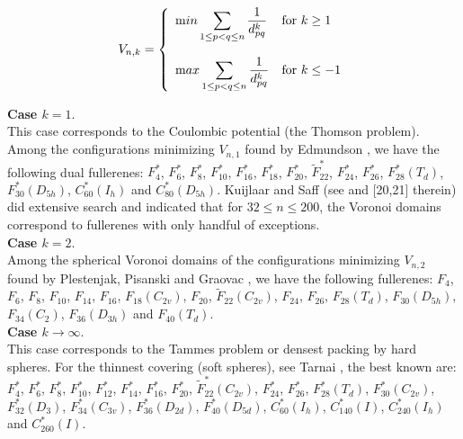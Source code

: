 
\begin{displaymath}
V_{n,k}=\left\{
\begin{array}{ll}
{\displaystyle {\mbox min} \sum_{1\leq p<q\leq n}\frac{1}{d_{pq}^k}} & \mbox{for } k\geq 1\\\\
{\displaystyle {\mbox max} \sum_{1\leq p<q\leq n}\frac{1}{d_{pq}^k}} & \mbox{for } k\leq -1
\end{array}
\right.
\end{displaymath}

\noindent
{\bf Case $k=1$}.\\
This case corresponds to the Coulombic potential (the {\sc Thomson} problem).
Among the configurations minimizing $V_{n,1}$ found by {\sc Edmundson} \cite{e92},
we have the following dual fullerenes:
$F^*_4$, $F^*_6$, $F^*_{8}$, $F^*_{10}$, $F^*_{16}$, $F^*_{18}$, $F^*_{20}$,
$\tilde{F}^*_{22}$, $F^*_{24}$, $F^*_{26}$,
$F^*_{28}(T_d)$, $F^*_{30}(D_{5h})$, $C^*_{60}(I_h)$ and  $C^*_{80}(D_{5h})$.
{\sc Kuijlaar and Saff} (see \cite{ks97} and [20,21] therein) did extensive search and
indicated that for $32\leq n\leq 200$, the Voronoi domains correspond to
fullerenes with only handful of exceptions.\\

\noindent
{\bf Case $k=2$}.\\
Among the spherical Voronoi domains of the configurations minimizing $V_{n,2}$ found by
{\sc Plestenjak, Pisanski and Graovac} \cite{ppg96},
we have the following fullerenes:
$F_4$, $F_6$, $F_{8}$, $F_{10}$, $F_{14}$, $F_{16}$, $F_{18}(C_{2v})$, $F_{20}$, 
$\tilde{F}_{22}(C_{2v})$, $F_{24}$, $F_{26}$,
$F_{28}(T_d)$, $F_{30}(D_{5h})$, $F_{34}(C_2)$, $F_{36}(D_{3h})$ and $F_{40}(T_d)$.\\

\noindent
{\bf Case $k\to \infty$}.\\
This case corresponds to the {\sc Tammes} problem or densest packing by hard spheres.
For the thinnest covering (soft spheres), see {\sc Tarnai} \cite{tarnai2}, the best
known are: 
$F^*_4$, $F^*_6$, $F^*_{8}$, $F^*_{10}$, $F^*_{12}$, $F^*_{14}$, $F^*_{16}$,
$F^*_{20}$, $\tilde{F}^*_{22}(C_{2v})$, $F^*_{24}$, $F^*_{26}$,
$F^*_{28}(T_d)$, $F^*_{30}(C_{2v})$, $F^*_{32}(D_3)$, $F^*_{34}(C_{3v})$, 
$F^*_{36}(D_{2d})$, $F^*_{40}(D_{5d})$, $C^*_{60}(I_h)$, $C^*_{140}(I)$,
$C^*_{240}(I_h)$ and $C^*_{260}(I)$.\\

